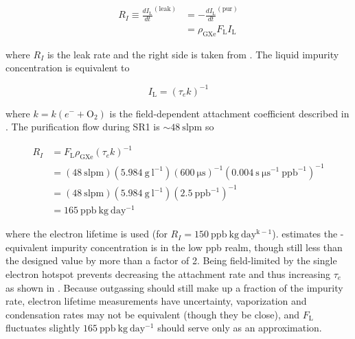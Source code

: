 \begin{equation}
\begin{aligned}
R_I \equiv \frac{dI_{\mathrm{L}}}{dt}^{(\mathrm{leak})} &= -\frac{dI_{\mathrm{L}}}{dt}^{(\mathrm{pur})}
\\
&= \rho_{\mathrm{GXe}} F_{\mathrm{L}} I_{\mathrm{L}}
\end{aligned}
\end{equation}

\noindent where $R_I$ is the leak rate and the right side is taken from .  The liquid
impurity concentration is equivalent to

\begin{equation}
I_{\mathrm{L}} = ( \tau_e k)^{-1}
\end{equation}

\noindent where $k = k(e^- + \mathrm{O_2})$ is the field-dependent \electron attachment coefficient described in
.  The purification flow during SR1 is ${\sim} 48\ \mathrm{slpm}$ so

\begin{equation}
\begin{aligned}
R_I &= F_{\mathrm{L}} \rho_{\mathrm{GXe}} (\tau_e k)^{-1} \\[2pt]
&= (48\ \mathrm{slpm}) (5.984\ \mathrm{g\ l^{-1}}) (600\ \mathrm{\mu s})^{-1} (0.004\ \mathrm{s\ \mu s^{-1}\ ppb^{-1}})^{-1} \\[2pt]
&= (48\ \mathrm{slpm}) (5.984\ \mathrm{g\ l^{-1}}) (2.5\ \mathrm{ppb^{-1}})^{-1} \\[2pt]
&= 165\ \mathrm{ppb\ kg\ day^{-1}}
\label{eq:electron_lifetime_model_outgassing_leak}
\end{aligned}
\end{equation}

\noindent where the \alphadecay electron lifetime is used (for
\metakr $R_I = 150\ \mathrm{ppb\ kg\ day^{k-1}}$).   estimates the -equivalent
impurity concentration is in the low ppb realm, though still less than the designed value by more than a factor of 2.  Being field-limited
by the single electron hotspot prevents decreasing the attachment rate and thus increasing $\tau_e$ as shown in
.  Because outgassing should still make up a fraction
of the impurity rate, electron lifetime measurements
have uncertainty, vaporization and condensation rates may not be equivalent (though they be close), and $F_{\mathrm{L}}$ fluctuates
slightly $165\ \mathrm{ppb\ kg\ day^{-1}}$ should serve only as an approximation.



